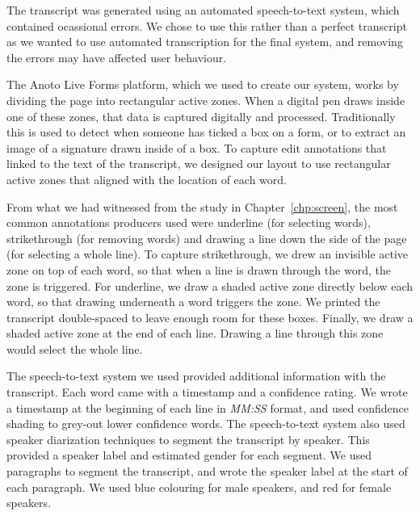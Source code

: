 The transcript was generated using an automated speech-to-text system, which contained ocassional errors. We chose to
use this rather than a perfect transcript as we wanted to use automated transcription for the final system, and
removing the errors may have affected user behaviour.

The Anoto Live Forms platform, which we used to create our system, works by dividing the page into rectangular active
zones.  When a digital pen draws inside one of these zones, that data is captured digitally and processed.
Traditionally this is used to detect when someone has ticked a box on a form, or to extract an image of a signature
drawn inside of a box.  To capture edit annotations that linked to the text of the transcript, we designed our layout
to use rectangular active zones that aligned with the location of each word.

From what we had witnessed from the study in Chapter~\ref{chp:screen}, the most common annotations producers used were
underline (for selecting words), strikethrough (for removing words) and drawing a line down the side of the page (for
selecting a whole line).  To capture strikethrough, we drew an invisible active zone on top of each word, so that when
a line is drawn through the word, the zone is triggered. For underline, we draw a shaded active zone directly below
each word, so that drawing underneath a word triggers the zone. We printed the transcript double-spaced to leave enough
room for these boxes. Finally, we draw a shaded active zone at the end of each line. Drawing a line through this zone
would select the whole line.

The speech-to-text system we used provided additional information with the transcript.  Each word came with a timestamp
and a confidence rating. We wrote a timestamp at the beginning of each line in \textit{MM:SS} format, and used
confidence shading to grey-out lower confidence words.  The speech-to-text system also used speaker diarization
techniques to segment the transcript by speaker. This provided a speaker label and estimated gender for each segment.
We used paragraphs to segment the transcript, and wrote the speaker label at the start of each paragraph. We used blue
colouring for male speakers, and red for female speakers.

